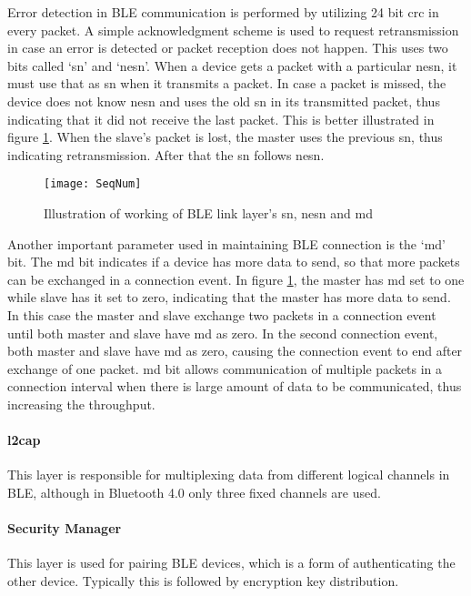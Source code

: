 Error detection in BLE communication is performed by utilizing 24 bit \gls{crc} in every packet. A simple acknowledgment scheme is used to request retransmission in case an error is detected or packet reception does not happen. This uses two bits called `\gls{sn}' and `\gls{nesn}'. When a device gets a packet with a particular \gls{nesn},  it must use that as \gls{sn} when it transmits a packet. In case a packet is missed, the device does not know \gls{nesn} and uses the old \gls{sn} in its transmitted packet, thus indicating that it did not receive the last packet. This is better illustrated in figure \ref{fig:SeqNum}. When the slave's packet is lost, the master uses the previous \gls{sn}, thus indicating retransmission. After that the \gls{sn} follows \gls{nesn}.

\begin{figure}[h]
\texttt{[image: SeqNum]}
\caption{Illustration of working of BLE link layer's \gls{sn}, \gls{nesn} and \acrshort{md}}
\label{fig:SeqNum}
\end{figure}
 
Another important parameter used in maintaining BLE connection is the `\gls{md}' bit. The \gls{md} bit indicates if a device has more data to send, so that more packets can be exchanged in a connection event. In figure \ref{fig:SeqNum}, the master has \gls{md} set to one while slave has it set to zero, indicating that the master has more data to send. In this case the master and slave exchange two packets in a connection event until both master and slave have \gls{md} as zero. In the second connection event, both master and slave have \gls{md} as zero, causing the connection event to end after exchange of one packet. \gls{md} bit allows communication of multiple packets in a connection interval when there is large amount of data to be communicated, thus increasing the throughput.

\paragraph{\gls{l2cap}} This layer is responsible for multiplexing data from different logical channels in BLE, although in Bluetooth 4.0 only three fixed channels are used. 

\paragraph{Security Manager} This layer is used for pairing BLE devices, which is a form of authenticating the other device. Typically this is followed by encryption key distribution.


